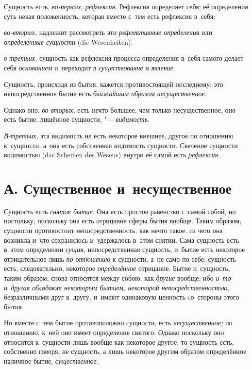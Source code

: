 Сущность есть, {\em во-первых, рефлексия}. Рефлексия определяет себя;
её определения суть некая положенность, которая вместе с~тем есть
рефлексия в~себя;

{\em во-вторых,} надлежит рассмотреть эти {\em рефлективные определения} или
{\em определённые сущности} (die Wesenheiten);

{\em в-третьих,} сущность как рефлексия процесса
определения в~себя самого делает себя {\em основанием}
и~переходит в {\em существование} и {\em явление}.


Сущность, происходя из бытия, кажется
противостоящей последнему; это непосредственное бытие есть
{\em ближайшим образом несущественное}.

Однако оно, {\em во-вторых,} есть нечто большее, чем только
несущественное, оно есть бытие, лишённое сущности, "--- {\em видимость}.

{\em В-третьих,} эта видимость не есть некоторое
внешнее, другое по отношению к~сущности, а~она есть собственная видимость
сущности. Свечение сущности видимостью (das Scheinen des Wesens) внутри её
самой есть {\em рефлексия}.

\section[А. Существенное и~несущественное]{А. Существенное и~несущественное}

Сущность есть {\em снятое бытие}.
Она есть простое равенство с~самой собой, но постольку, поскольку
она есть отрицание сферы бытия вообще. Таким образом, сущности противостоит
непосредственность, как нечто такое, из чего она возникла и~что сохранилось
и~удержалось в~этом снятии. Сама сущность есть в~этом определении
{\em сущая,} непосредственная сущность, и~бытие есть
некоторое отрицательное лишь {\em по отношению} к
сущности, а~не само по себе; сущность есть, следовательно, некоторое
{\em определённое} отрицание. Бытие и~сущность, таким
образом, снова относятся между собою, как {\em другие} вообще, ибо
{\em и~то и~другая обладают некоторым бытием, некоторой непосредственностью,}
безразличными друг к~другу, и~имеют одинаковую ценность cо~стороны этого бытия.

Но вместе с~тем бытие противоположно сущности, есть
{\em несущественное;} по отношению, к~ней оно имеет
определение снятого. Однако поскольку оно относится к~сущности лишь вообще
как некоторое другое, то сущность есть, собственно говоря, не сущность, а
лишь некоторое другим образом определённое наличное бытие,
{\em существенное}.


